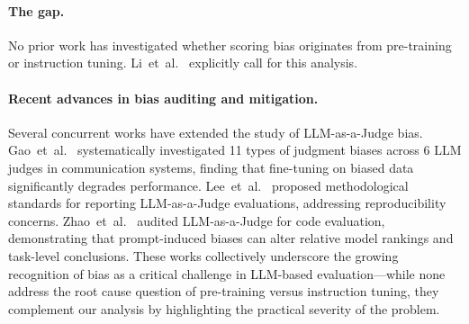 \documentclass[11pt,twocolumn]{article}
\begin{document}
\paragraph{The gap.}
No prior work has investigated whether scoring bias originates from pre-training or instruction tuning. Li~et~al.~\cite{li2025scoring} explicitly call for this analysis.

\paragraph{Recent advances in bias auditing and mitigation.}
Several concurrent works have extended the study of LLM-as-a-Judge bias. Gao~et~al.~\cite{gao2025evaluating} systematically investigated 11 types of judgment biases across 6 LLM judges in communication systems, finding that fine-tuning on biased data significantly degrades performance. Lee~et~al.~\cite{lee2025correctly} proposed methodological standards for reporting LLM-as-a-Judge evaluations, addressing reproducibility concerns. Zhao~et~al.~\cite{zhao2026bias} audited LLM-as-a-Judge for code evaluation, demonstrating that prompt-induced biases can alter relative model rankings and task-level conclusions. These works collectively underscore the growing recognition of bias as a critical challenge in LLM-based evaluation---while none address the root cause question of pre-training versus instruction tuning, they complement our analysis by highlighting the practical severity of the problem.
\end{document}
